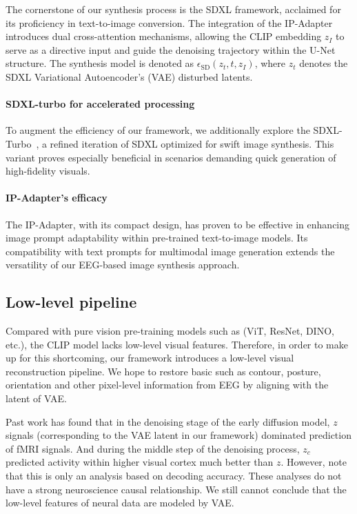 \documentclass{article}
\begin{document}
The cornerstone of our synthesis process is the SDXL framework, acclaimed for its proficiency in text-to-image conversion. The integration of the IP-Adapter introduces dual cross-attention mechanisms, allowing the CLIP embedding \( z_I \) to serve as a directive input and guide the denoising trajectory within the U-Net structure. The synthesis model is denoted as \( \epsilon_{\text{SD}}(z_t, t, z_I) \), where \( z_t \) denotes the SDXL Variational Autoencoder's (VAE) disturbed latents.


\paragraph{SDXL-turbo for accelerated processing} To augment the efficiency of our framework, we additionally explore the SDXL-Turbo~\cite{sauer2023adversarial}, a refined iteration of SDXL optimized for swift image synthesis. This variant proves especially beneficial in scenarios demanding quick generation of high-fidelity visuals.

\paragraph{IP-Adapter's efficacy} The IP-Adapter, with its compact design, has proven to be effective in enhancing image prompt adaptability within pre-trained text-to-image models. Its compatibility with text prompts for multimodal image generation extends the versatility of our EEG-based image synthesis approach.

\subsection{Low-level pipeline}

Compared with pure vision pre-training models such as (ViT, ResNet, DINO, etc.), the CLIP model lacks low-level visual features. Therefore, in order to make up for this shortcoming, our framework introduces a low-level visual reconstruction pipeline. We hope to restore basic such as contour, posture, orientation and other pixel-level information from EEG by aligning with the latent of VAE. 

Past work \cite{takagi2023high} has found that in the denoising stage of the early diffusion model, $z$ signals (corresponding to the VAE latent in our framework) dominated prediction of fMRI signals. And during the middle step of the denoising process, $z_c$ predicted activity within higher visual cortex much better than $z$. However, note that this is only an analysis based on decoding accuracy. These analyses do not have a strong neuroscience causal relationship. We still cannot conclude that the low-level features of neural data are modeled by VAE.
\end{document}

